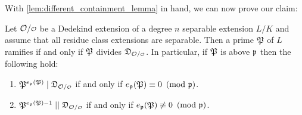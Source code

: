     With \cref{lem:different_containment_lemma} in hand, we can now prove our claim:

    \begin{theorem}\label{thm:ramifies_if_and_only_if_divides_the_different}
      Let $\mc{O}/\smc{O}$ be a Dedekind extension of a degree $n$ separable extension $L/K$ and assume that all residue class extensions are separable. Then a prime $\mathfrak{P}$ of $L$ ramifies if and only if $\mathfrak{P}$ divides $\mf{D}_{\mc{O}/\smc{O}}$. In particular, if $\mathfrak{P}$ is above $\mathfrak{p}$ then the following hold:
      \begin{enumerate}[label=(\roman*)]
        \item $\mf{P}^{e_{\mf{p}}(\mf{P})} \mid \mf{D}_{\mc{O}/\smc{O}}$ if and only if $e_{\mathfrak{p}}(\mathfrak{P}) \equiv 0 \ \left(\text{mod }\mathfrak{p}\right)$.
        \item $\mf{P}^{e_{\mf{p}}(\mf{P})-1} \mid\mid \mf{D}_{\mc{O}/\smc{O}}$ if and only if $e_{\mathfrak{p}}(\mathfrak{P}) \not\equiv 0 \ \left(\text{mod }\mathfrak{p}\right)$.
      \end{enumerate}
    \end{theorem}
